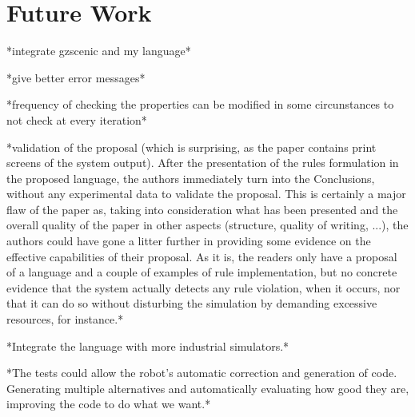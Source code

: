 \chapter{Future Work}
\label{chap:futurework}

*integrate gzscenic and my language*

*give better error messages*

*frequency of checking the properties can be modified in some circunstances to not check at every iteration*

*validation of the proposal (which is surprising, as the paper contains print screens of the system output). After the presentation of the rules formulation in the proposed language, the authors immediately turn into the Conclusions, without any experimental data to validate the proposal. This is certainly a major flaw of the paper as, taking into consideration what has been presented and the overall quality of the paper in other aspects (structure, quality of writing, ...), the authors could have gone a litter further in providing some evidence on the effective capabilities of their proposal. As it is, the readers only have a proposal of a language and a couple of examples of rule implementation, but no concrete evidence that the system actually detects any rule violation, when it occurs, nor that it can do so without disturbing the simulation by demanding excessive resources, for instance.*

*Integrate the language with more industrial simulators.*

*The tests could allow the robot's automatic correction and generation of code. Generating multiple alternatives and automatically evaluating how good they are, improving the code to do what we want.*
